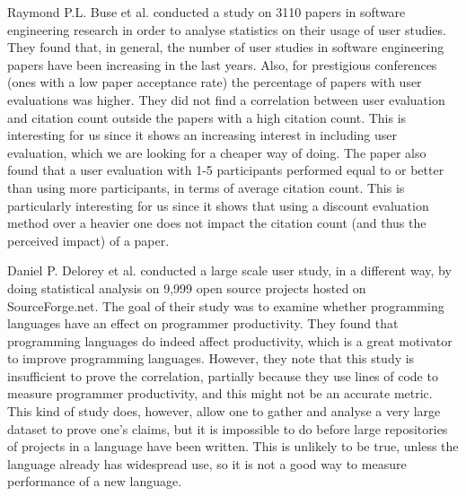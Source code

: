 Raymond P.L. Buse et al. \cite{UserEvalPapers} conducted a study on 3110 papers in software engineering research in order to analyse statistics on their usage of user studies.
They found that, in general, the number of user studies in software engineering papers have been increasing in the last years.
Also, for prestigious conferences (ones with a low paper acceptance rate) the percentage of papers with user evaluations was higher.
They did not find a correlation between user evaluation and citation count outside the papers with a high citation count.
This is interesting for us since it shows an increasing interest in including user evaluation, which we are looking for a cheaper way of doing.
The paper also found that a user evaluation with 1-5 participants performed equal to or better than using more participants, in terms of average citation count.
This is particularly interesting for us since it shows that using a discount evaluation method over a heavier one does not impact the citation count (and thus the perceived impact) of a paper.

Daniel P. Delorey et al. \cite{LanguageProductivity} conducted a large scale user study, in a different way, by doing statistical analysis on 9,999 open source projects hosted on SourceForge.net.
The goal of their study was to examine whether programming languages have an effect on programmer productivity.
They found that programming languages do indeed affect productivity, which is a great motivator to improve programming languages.
However, they note that this study is insufficient to prove the correlation, partially because they use lines of code to measure programmer productivity, and this might not be an accurate metric.
This kind of study does, however, allow one to gather and analyse a very large dataset to prove one's claims, but it is impossible to do before large repositories of projects in a language have been written.
This is unlikely to be true, unless the language already has widespread use, so it is not a good way to measure performance of a new language.
